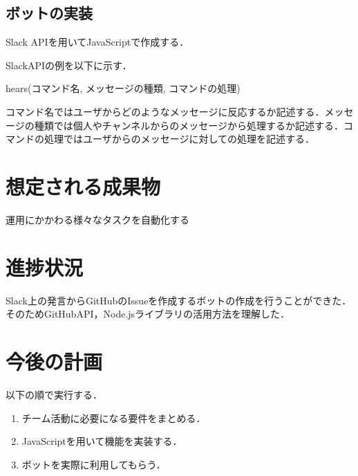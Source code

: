 \documentclass[uplatex,twocolumn,dvipdfmx]{jsarticle}
\begin{document}
\subsection{ボットの実装}
Slack APIを用いてJavaScriptで作成する．

SlackAPIの例を以下に示す．

hears(コマンド名, メッセージの種類, コマンドの処理)

コマンド名ではユーザからどのようなメッセージに反応するか記述する．メッセージの種類では個人やチャンネルからのメッセージから処理するか記述する．コマンドの処理ではユーザからのメッセージに対しての処理を記述する．





\section{想定される成果物}
運用にかかわる様々なタスクを自動化する

\section{進捗状況}
Slack上の発言からGitHubのIssueを作成するボットの作成を行うことができた．そのためGitHubAPI，Node.jsライブラリの活用方法を理解した．




\section{今後の計画}
以下の順で実行する．
\begin{enumerate}
\item チーム活動に必要になる要件をまとめる．
\item JavaScriptを用いて機能を実装する．
\item ボットを実際に利用してもらう．
\end{enumerate}




\end{document}
